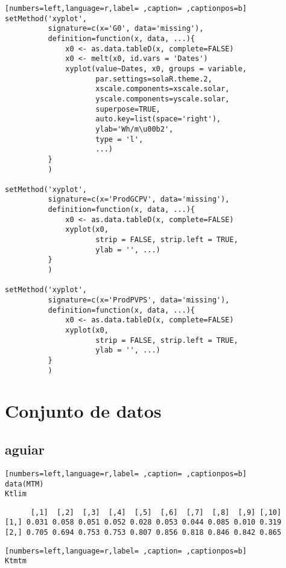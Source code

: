 \begin{lstlisting}[numbers=left,language=r,label= ,caption= ,captionpos=b]
setMethod('xyplot',
          signature=c(x='G0', data='missing'),
          definition=function(x, data, ...){
              x0 <- as.data.tableD(x, complete=FALSE)              
              x0 <- melt(x0, id.vars = 'Dates')
              xyplot(value~Dates, x0, groups = variable,
                     par.settings=solaR.theme.2,
                     xscale.components=xscale.solar,
                     yscale.components=yscale.solar,
                     superpose=TRUE,
                     auto.key=list(space='right'),
                     ylab='Wh/m\u00b2',
                     type = 'l',
                     ...)     
          }
          )

setMethod('xyplot',
          signature=c(x='ProdGCPV', data='missing'),
          definition=function(x, data, ...){
              x0 <- as.data.tableD(x, complete=FALSE)
              xyplot(x0,
                     strip = FALSE, strip.left = TRUE,
                     ylab = '', ...)
          }
          )

setMethod('xyplot',
          signature=c(x='ProdPVPS', data='missing'),
          definition=function(x, data, ...){
              x0 <- as.data.tableD(x, complete=FALSE)
              xyplot(x0,
                     strip = FALSE, strip.left = TRUE,
                     ylab = '', ...)
          }
          )
\end{lstlisting}
\section{Conjunto de datos}
\label{sec:org1f17a14}
\subsection{aguiar}
\label{sec:orge035f34}
\begin{lstlisting}[numbers=left,language=r,label= ,caption= ,captionpos=b]
data(MTM)
Ktlim
\end{lstlisting}

\begin{verbatim}
      [,1]  [,2]  [,3]  [,4]  [,5]  [,6]  [,7]  [,8]  [,9] [,10]
[1,] 0.031 0.058 0.051 0.052 0.028 0.053 0.044 0.085 0.010 0.319
[2,] 0.705 0.694 0.753 0.753 0.807 0.856 0.818 0.846 0.842 0.865
\end{verbatim}


\begin{lstlisting}[numbers=left,language=r,label= ,caption= ,captionpos=b]
Ktmtm
\end{lstlisting}

